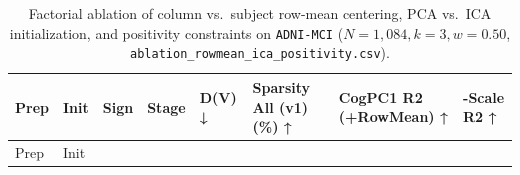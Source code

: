 \documentclass[
  10pt,
  letterpaper,
]{report}
\begin{document}
\begin{longtable}[]{@{}
  >{\raggedright\arraybackslash}p{}
  >{\raggedright\arraybackslash}p{}
  >{\raggedright\arraybackslash}p{}
  >{\raggedright\arraybackslash}p{}
  >{\raggedleft\arraybackslash}p{}
  >{\raggedleft\arraybackslash}p{}
  >{\raggedleft\arraybackslash}p{}
  >{\raggedleft\arraybackslash}p{}@{}}
\caption{Factorial ablation of column vs.~subject row-mean centering,
PCA vs.~ICA initialization, and positivity constraints on
\protect\texttt{ADNI-MCI} (\(N = 1,084, k = 3, w = 0.50\),
\protect\texttt{ablation\_rowmean\_ica\_positivity.csv}).}\label{tbl-app-rowmean-ica}\tabularnewline
\toprule\noalign{}
\begin{minipage}[b]{\linewidth}\raggedright
Prep
\end{minipage} & \begin{minipage}[b]{\linewidth}\raggedright
Init
\end{minipage} & \begin{minipage}[b]{\linewidth}\raggedright
Sign
\end{minipage} & \begin{minipage}[b]{\linewidth}\raggedright
Stage
\end{minipage} & \begin{minipage}[b]{\linewidth}\raggedleft
D(V) ↓
\end{minipage} & \begin{minipage}[b]{\linewidth}\raggedleft
Sparsity All (v1) (\%) ↑
\end{minipage} & \begin{minipage}[b]{\linewidth}\raggedleft
CogPC1 R2 (+RowMean) ↑
\end{minipage} & \begin{minipage}[b]{\linewidth}\raggedleft
11-Scale R2 ↑
\end{minipage} \\
\midrule\noalign{}
\endfirsthead
\toprule\noalign{}
\begin{minipage}[b]{\linewidth}\raggedright
Prep
\end{minipage} & \begin{minipage}[b]{\linewidth}\raggedright
Init
\end{minipage} & \begin{minipage}[b]{\linewidth}\raggedright

\end{minipage}
\end{longtable}
\end{document}
